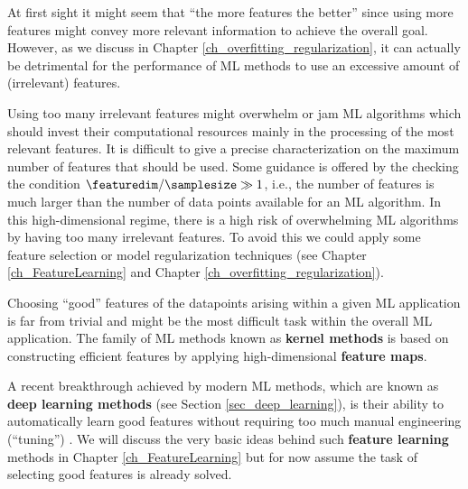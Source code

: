 \documentclass[12pt]{report}
\newcommand{\featurelen}{\featuredim}
\begin{document}
At first sight it might seem that ``the more features the better'' since using more features 
might convey more relevant information to achieve the overall goal. However, as we discuss 
in Chapter \ref{ch_overfitting_regularization}, it can actually be detrimental for the performance 
of ML methods to use an excessive amount of (irrelevant) features. 

Using too many irrelevant features might overwhelm or jam ML algorithms which should invest 
their computational resources mainly in the processing of the most relevant features. It is 
difficult to give a precise characterization on the maximum number of features that should be 
used. Some guidance is offered by the checking the condition $\featurelen/\samplesize \gg 1$, i.e., the number 
of features is much larger than the number of data points available for an ML algorithm. In this 
high-dimensional regime, there is a high risk of overwhelming ML algorithms by having too many 
irrelevant features. To avoid this we could apply some feature selection or model regularization 
techniques (see Chapter \ref{ch_FeatureLearning} and Chapter \ref{ch_overfitting_regularization}). 

Choosing ``good'' features of the datapoints arising within a given ML application 
is far from trivial and might be the most difficult task within the overall ML application. 
The family of ML methods known as {\bf kernel methods} \cite{LampertNowKernel} 
is based on constructing efficient features by applying high-dimensional {\bf feature maps}. 

A recent breakthrough achieved by modern ML methods, which are known as 
{\bf deep learning methods} (see Section \ref{sec_deep_learning}), is their ability 
to automatically learn good features without requiring too much manual engineering 
(``tuning'') \cite{Goodfellow-et-al-2016}. We will discuss the very basic ideas behind 
such {\bf feature learning} methods in Chapter \ref{ch_FeatureLearning} but for now 
assume the task of selecting good features is already solved. 
\end{document}
